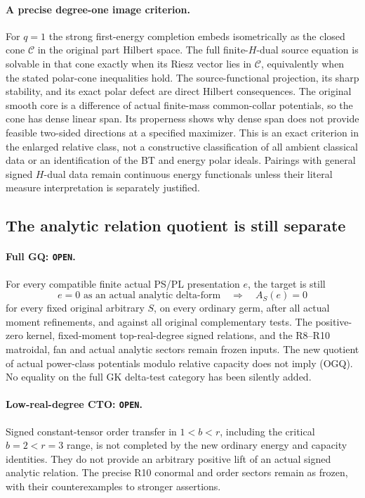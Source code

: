 \documentclass[11pt,a4paper]{article}
\numberwithin{equation}{section}
\theoremstyle{definition}
\theoremstyle{remark}
\begin{document}
\paragraph{A precise degree-one image criterion.}
For $q=1$ the strong first-energy completion embeds
isometrically as the closed cone $\mathcal C$ in the
original part Hilbert space. The full finite-$H$-dual
source equation is solvable in that cone exactly when
its Riesz vector lies in $\mathcal C$, equivalently
when the stated polar-cone inequalities hold.
The source-functional projection, its sharp stability,
and its exact polar defect are direct Hilbert consequences.
The original smooth core is a difference of actual
finite-mass common-collar potentials, so the cone has
dense linear span. Its properness shows why dense span
does not provide feasible two-sided directions at a
specified maximizer.
This is an exact criterion in the enlarged relative
class, not a constructive classification of all ambient
classical data or an identification of the BT and energy
polar ideals. Pairings with general signed $H$-dual data
remain continuous energy functionals unless their literal
measure interpretation is separately justified.

\subsection{The analytic relation quotient is still separate}

\paragraph{Full GQ: \texttt{OPEN}.}
For every compatible finite actual PS/PL
presentation $e$, the target is still
\[
 e=0\text{ as an actual analytic delta-form}
           \quad\Longrightarrow\quad A_S(e)=0
 \tag{OGQ}
\]
for every fixed original arbitrary $S$,
on every ordinary germ, after all actual
moment refinements, and against all original
complementary tests.
The positive-zero kernel, fixed-moment
top-real-degree signed relations, and the
R8--R10 matroidal, fan and actual analytic
sectors remain frozen inputs.
The new quotient of actual power-class
potentials modulo relative capacity
does not imply (OGQ).
No equality on the full GK delta-test
category has been silently added.

\paragraph{Low-real-degree CTO: \texttt{OPEN}.}
Signed constant-tensor order transfer in
$1<b<r$, including the critical
$b=2<r=3$ range, is not completed by
the new ordinary energy and capacity
identities.  They do not provide an
arbitrary positive lift of an actual
signed analytic relation.
The precise R10 conormal and order
sectors remain as frozen, with their
counterexamples to stronger assertions.
\end{document}
